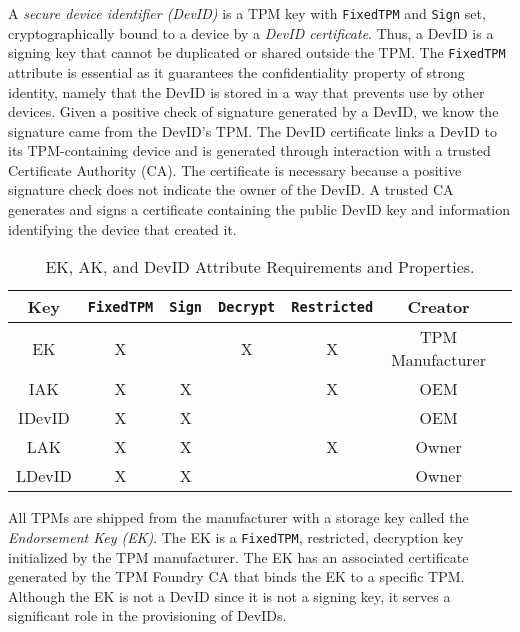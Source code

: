 \documentclass[runningheads]{llncs}
\begin{document}
A \emph{secure device identifier (DevID)} is a TPM key with
\verb|FixedTPM| and \verb|Sign| set, cryptographically bound to a
device by a \emph{DevID certificate}.  Thus, a DevID is a signing key
that cannot be duplicated or shared outside the TPM.  The
\verb|FixedTPM| attribute is essential as it guarantees the
confidentiality property of strong identity, namely that the DevID is
stored in a way that prevents use by other devices. Given a positive
check of signature generated by a DevID, we know the signature came
from the DevID's TPM.  The DevID certificate links a DevID to its
TPM-containing device and is generated through interaction with a
trusted Certificate Authority (CA).  The certificate is necessary
because a positive signature check does not indicate the owner of the
DevID.  A trusted CA generates and signs a certificate containing the
public DevID key and information identifying the device that created
it.

\begin{table}[hbtp]
  \begin{center}
    \footnotesize
    \begin{tabular}{ |c|c|c|c|c|c|c| }
      \hline
Key & \verb|FixedTPM| & \verb|Sign| & \verb|Decrypt| & \verb|Restricted| &
Creator \\
      \hline
      \hline
      EK & X &   & X & X & TPM Manufacturer \\
      \hline
      IAK & X & X &   & X & OEM   \\
      \hline
      IDevID & X & X &   &   & OEM   \\
      \hline
      LAK & X & X &   & X & Owner  \\
      \hline
      LDevID & X & X &   &   & Owner  \\
      \hline
    \end{tabular}
    \caption{EK, AK, and DevID Attribute Requirements and Properties.}
    \label{fig:req_and_recs}
  \end{center}
\end{table}

All TPMs are shipped from the manufacturer with a storage key called
the \emph{Endorsement Key (EK)}.  The EK is a \verb|FixedTPM|,
restricted, decryption key initialized by the TPM manufacturer.  The
EK has an associated certificate generated by the TPM Foundry CA that
binds the EK to a specific TPM. Although the EK is not a DevID since
it is not a signing key, it serves a significant role in the
provisioning of DevIDs.
\end{document}
